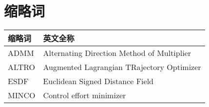 \chapter*{缩略词}

\noindent\begin{tabu} to \textwidth {|X[1,c]|X[4,c]|}\hline
缩略词 & 英文全称 \\ \hline
ADMM & Alternating Direction Method of Multiplier \\ \hline
ALTRO & Augmented Lagrangian TRajectory Optimizer \\ \hline
ESDF & Euclidean Signed Distance Field \\ \hline
MINCO & Control effort minimizer \\ \hline

\end{tabu}
